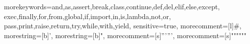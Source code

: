 %
  {morekeywords={and,as,assert,break,class,continue,def,del,elif,else,except,%
      exec,finally,for,from,global,if,import,in,is,lambda,not,or,%
      pass,print,raise,return,try,while,with,yield},%
   sensitive=true,%
   morecomment=[l]\#,%
   morestring=[b]',%
   morestring=[b]",%
   morecomment=[s]{'''}{'''},%
   morecomment=[s]{"""}{"""}%
}%
%
%
